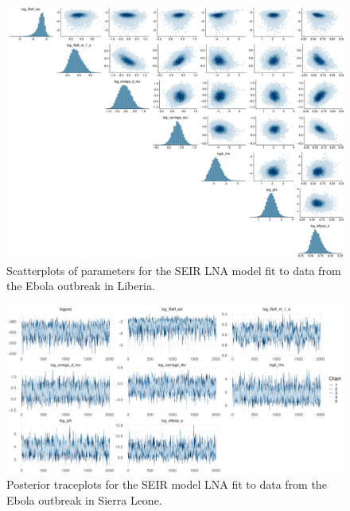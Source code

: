 \begin{figure}[htbp]
	\centering
	\includegraphics[width=\linewidth]{figures/lib_tight_pairs}
	\caption{Scatterplots of parameters for the SEIR LNA model fit to data from the Ebola outbreak in Liberia.}
	\label{fig:liberiapairs}
\end{figure}

\begin{figure}
	\centering
	\includegraphics[width=\linewidth]{figures/sln_tight_traces}
	\caption{Posterior traceplots for the SEIR model LNA fit to data from the Ebola outbreak in Sierra Leone.}
	\label{fig:sierraleonetraces}
\end{figure}

